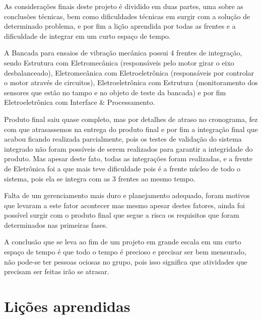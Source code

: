 
As considerações finais deste projeto é dividido em duas partes, uma sobre as conclusões técnicas, bem como dificuldades técnicas em surgir com a solução de determinado problema, e por fim a lição aprendida por todas as frentes e a dificuldade de integrar em um curto espaço de tempo.

A Bancada para ensaios de vibração mecânica possui 4 frentes de integração, sendo Estrutura com Eletromecânica (responsáveis pelo motor girar o eixo desbalanceado), Eletromecânica com Eletroeletrônica (responsáveis por controlar o motor através de circuitos), Eletroeletrônica com Estrutura (monitoramento dos sensores que estão no tampo e no objeto de teste da bancada) e por fim Eletroeletrônica com Interface \& Processamento.

Produto final saiu quase completo, mas por detalhes de atraso no cronograma, fez com que atrasassemos na entrega do produto final e por fim a integração final que acabou ficando realizada parcialmente, pois os testes de validação do sistema integrado não foram possíveis de serem realizados para garantir a integridade do produto. Mas apesar deste fato, todas as integrações foram realizadas, e a frente de Eletrônica foi a que mais teve dificuldade pois é a frente núcleo de todo o sistema, pois ela se integra com as 3 frentes ao mesmo tempo.

Falta de um gerenciamento mais duro e planejamento adequado, foram motivos que levaram a este fator acontecer mas mesmo apesar destes fatores, ainda foi possível surgir com o produto final que segue a risca os requisitos que foram determinados nas primeiras fases.

A conclusão que se leva ao fim de um projeto em grande escala em um curto espaço de tempo é que todo o tempo é precioso e precisar ser bem mensurado, não pode-se ter pessoas ociosas no grupo, pois isso significa que atividades que precisam ser feitas irão se atrasar.


\section*{Lições aprendidas}

